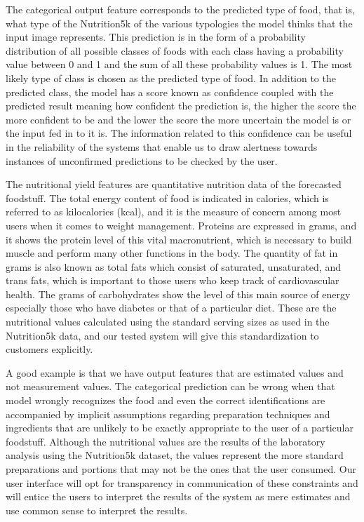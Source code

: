 \documentclass[12pt, openany]{report}
\begin{document}
The categorical output feature corresponds to the predicted type of food, that is, what type of the Nutrition5k of the various typologies the model thinks that the input image represents. This prediction is in the form of a probability distribution of all possible classes of foods with each class having a probability value between 0 and 1 and the sum of all these probability values is 1. The most likely type of class is chosen as the predicted type of food. In addition to the predicted class, the model has a score known as confidence coupled with the predicted result meaning how confident the prediction is, the higher the score the more confident to be and the lower the score the more uncertain the model is or the input fed in to it is. The information related to this confidence can be useful in the reliability of the systems that enable us to draw alertness towards instances of unconfirmed predictions to be checked by the user.

The nutritional yield features are quantitative nutrition data of the forecasted foodstuff. The total energy content of food is indicated in calories, which is referred to as kilocalories (kcal), and it is the measure of concern among most users when it comes to weight management. Proteins are expressed in grams, and it shows the protein level of this vital macronutrient, which is necessary to build muscle and perform many other functions in the body. The quantity of fat in grams is also known as total fats which consist of saturated, unsaturated, and trans fats, which is important to those users who keep track of cardiovascular health. The grams of carbohydrates show the level of this main source of energy especially those who have diabetes or that of a particular diet. These are the nutritional values calculated using the standard serving sizes as used in the Nutrition5k data, and our tested system will give this standardization to customers explicitly.

A good example is that we have output features that are estimated values and not measurement values. The categorical prediction can be wrong when that model wrongly recognizes the food and even the correct identifications are accompanied by implicit assumptions regarding preparation techniques and ingredients that are unlikely to be exactly appropriate to the user of a particular foodstuff. Although the nutritional values are the results of the laboratory analysis using the Nutrition5k dataset, the values represent the more standard preparations and portions that may not be the ones that the user consumed. Our user interface will opt for transparency in communication of these constraints and will entice the users to interpret the results of the system as mere estimates and use common sense to interpret the results.
\end{document}
